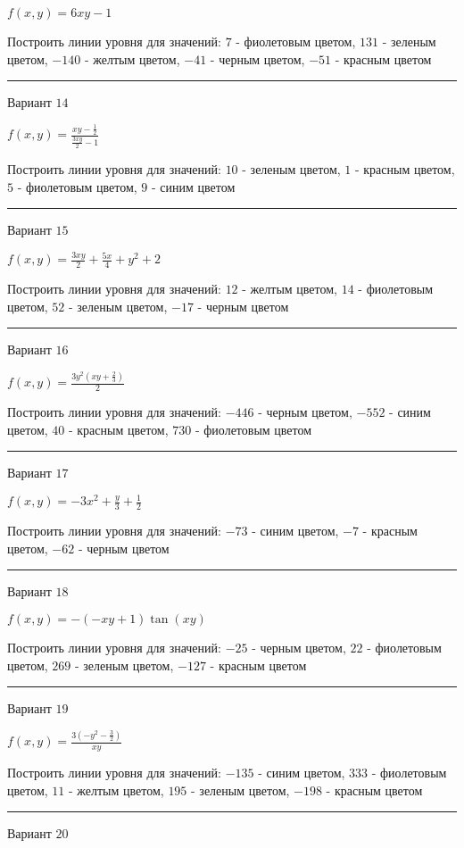 \documentclass[11pt]{report}
\begin{document}
$f(x, y) = 6 x y - 1$

Построить линии уровня для значений: $7$ - фиолетовым цветом, $131$ - зеленым цветом, $-140$ - желтым цветом, $-41$ - черным цветом, $-51$ - красным цветом
\begin{center}
\noindent\rule{8cm}{0.4pt}
\end{center}
Вариант $14$


$f(x, y) = \frac{x y - \frac{1}{2}}{\frac{3 x y}{2} - 1}$

Построить линии уровня для значений: $10$ - зеленым цветом, $1$ - красным цветом, $5$ - фиолетовым цветом, $9$ - синим цветом
\begin{center}
\noindent\rule{8cm}{0.4pt}
\end{center}
Вариант $15$


$f(x, y) = \frac{3 x y}{2} + \frac{5 x}{4} + y^{2} + 2$

Построить линии уровня для значений: $12$ - желтым цветом, $14$ - фиолетовым цветом, $52$ - зеленым цветом, $-17$ - черным цветом
\begin{center}
\noindent\rule{8cm}{0.4pt}
\end{center}
Вариант $16$


$f(x, y) = \frac{3 y^{2} \left(x y + \frac{2}{3}\right)}{2}$

Построить линии уровня для значений: $-446$ - черным цветом, $-552$ - синим цветом, $40$ - красным цветом, $730$ - фиолетовым цветом
\begin{center}
\noindent\rule{8cm}{0.4pt}
\end{center}
Вариант $17$


$f(x, y) = - 3 x^{2} + \frac{y}{3} + \frac{1}{2}$

Построить линии уровня для значений: $-73$ - синим цветом, $-7$ - красным цветом, $-62$ - черным цветом
\begin{center}
\noindent\rule{8cm}{0.4pt}
\end{center}
Вариант $18$


$f(x, y) = - \left(- x y + 1\right) \tan{\left(x y \right)}$

Построить линии уровня для значений: $-25$ - черным цветом, $22$ - фиолетовым цветом, $269$ - зеленым цветом, $-127$ - красным цветом
\begin{center}
\noindent\rule{8cm}{0.4pt}
\end{center}
Вариант $19$


$f(x, y) = \frac{3 \left(- y^{2} - \frac{3}{2}\right)}{x y}$

Построить линии уровня для значений: $-135$ - синим цветом, $333$ - фиолетовым цветом, $11$ - желтым цветом, $195$ - зеленым цветом, $-198$ - красным цветом
\begin{center}
\noindent\rule{8cm}{0.4pt}
\end{center}
Вариант $20$
\end{document}
